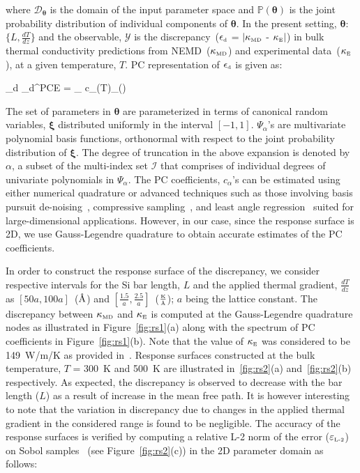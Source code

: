 \noindent where $\mathcal{D}_{\bm{\theta}}$ is the domain of the input parameter space and 
$\mathbb{P}(\bm{\theta})$ is the joint probability distribution of individual components of $\bm{\theta}$.
In the present setting, $\bm{\theta}$:~$\{L,\frac{dT}{dz}\}$ and the observable, $\mathcal{Y}$ is the
discrepancy~($\epsilon_{\mbox{\tiny{d}}}$ = 
$\lvert\kappa_{\mbox{\tiny{MD}}}$ - $\kappa_{\mbox{\tiny{E}}}\rvert$)
in bulk thermal conductivity predictions from 
NEMD~($\kappa_{\mbox{\tiny{MD}}}$) and experimental data~($\kappa_{\mbox{\tiny{E}}}$), at a 
given temperature, $T$. PC representation of $\epsilon_{\mbox{\tiny{d}}}$ is given as:

\be
\epsilon_{\mbox{\tiny{d}}} \approx \mathcal{\epsilon}_{\mbox{\tiny{d}}}^{\mbox{\tiny{PCE}}} = 
\sum_{\alpha\in{}} c_{\alpha}(T)\Psi_{\alpha}(\bm{\xi(\theta)}) 
\ee

\noindent The set of parameters in $\bm{\theta}$ are parameterized in terms of canonical random 
variables, $\bm{\xi}$ distributed uniformly in the interval $[-1,1]$. 
 $\Psi_{\alpha}$'s are multivariate polynomial basis functions, orthonormal with respect to the joint probability 
 distribution of $\bm{\xi}$. The degree of truncation in the above expansion is denoted by $\alpha$, a subset of
 the multi-index set $\mathcal{I}$ that comprises of individual degrees of univariate polynomials in $\Psi_{\alpha}$.
The PC coefficients, $c_{\alpha}$'s can be estimated using either numerical quadrature or advanced techniques
such as those involving basis pursuit de-noising~\cite{Peng:2014}, compressive
sampling~\cite{Hampton:2015}, and least angle regression~\cite{Blatman:2011} suited for large-dimensional
applications. However, in our case, since the response surface is 2D, we use Gauss-Legendre quadrature to
obtain accurate estimates of the PC coefficients. 
\bigskip

In order to construct the response surface of the discrepancy, we consider respective intervals for the Si bar length,
$L$ and the applied thermal gradient, $\frac{dT}{dz}$ as $[50a,100a]$~($\mbox{\normalfont\AA}$) and
 $[\frac{1.5}{a},\frac{2.5}{a}]$~($\frac{\mbox{\tiny{K}}}{\tiny{\mbox{\normalfont\AA}}}$); $a$ being the lattice constant. The 
 discrepancy between $\kappa_{\mbox{\tiny{MD}}}$ and $\kappa_{\mbox{\tiny{E}}}$ is computed at the
 Gauss-Legendre quadrature nodes as illustrated in Figure~\ref{fig:rs1}(a) 
  along with the spectrum of PC coefficients in Figure~\ref{fig:rs1}(b). Note that the value of $\kappa_{\mbox{\tiny{E}}}$ was considered to be 149~W/m/K as provided 
 in~\cite{Shanks:1963}. Response surfaces constructed at the bulk temperature, $T$ = 300~K and 500~K are 
 illustrated
 in~\ref{fig:rs2}(a) and~\ref{fig:rs2}(b) respectively. As expected, the discrepancy is observed to decrease
 with the bar length ($L$) as a result of increase in the mean free path. It is however interesting to note that the 
 variation in discrepancy due to changes in the applied thermal gradient in the considered range is found to be
 negligible. The accuracy of the response surfaces is verified by computing a relative L-2 norm of the error
 ($\varepsilon_{\tiny{\mbox{L-2}}}$) on Sobol samples~\cite{Saltelli:2010} (see Figure~\ref{fig:rs2}(c)) in the 2D 
 parameter domain as follows:
 
